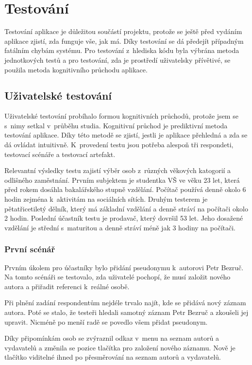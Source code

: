 
\chapter{Testování}
        Testování aplikace je důležitou součástí projektu, protože se ještě před vydáním aplikace zjistí, zda funguje vše, jak má. Díky testování se dá předejít případným fatálním chybám systému. Pro testování z~hlediska kódu byla výbrána metoda jednotkových testů a pro testování, zda je prostředí uživatelsky přívětivé, se použila metoda kognitivního průchodu aplikace.
        
    \section{Uživatelské testování}
        Uživatelské testování probíhalo formou kognitivních průchodů, protože jsem se s~nimy setkal v~průběhu studia. Kognitivní průchod je prediktivní metoda testování aplikace. Díky této metodě se zjistí, jestli je aplikace přehledná a zda se dá ovládat intuitivně. K~provedení testu jsou potřeba alespoň tři respondeti, testovací scénáře a testovací artefakt. 
        
        Relevantní výsledky testu zajistí výběr osob z~různých věkových katogorií a odlišného zaměstnání. Prvním subjektem je studentka VŠ ve věku 23 let, která před rokem dosáhla bakalářského stupně vzdělání. Počítač používá denně okolo 6 hodin zejména k~aktivitám na sociálních sítích. Druhým testerem je pětatřicetiletý dělník, který má základní vzdělání a denně stráví na počítači okolo 2 hodin. Poslední účastník testu je prodavač, který dovršil 53 let. Jeho dosažené vzdělání je střední s~maturitou a denně stráví méně jak 3 hodiny na počítači.
        
        \subsection{První scénář}
            Prvním úkolem pro účastníky bylo přidání pseudonymu k~autorovi Petr Bezruč. Na tomto scénáři se testovalo, zda uživatelé pochopí, že musí založit nového autora a přiřadit referenci k~reálné osobě.
            
            Při plnění zadání respondentům nejdéle trvalo najít, kde se přidává nový záznam autora. Poté se stalo, že testeři hledali samotný záznam Petr Bezruč a zkoušeli jej upravit. Nicméně po menší radě se povedlo všem přidat pseudonym.
            
            Díky připomínkám osob se zvýraznil odkaz v~menu na seznam autorů a vydavatelů a změnila se pozice tlačítka pro založení nového záznamu. Nově je tlačítko viditelné ihned po přesměrování na seznam autorů a vydavatelů. 

